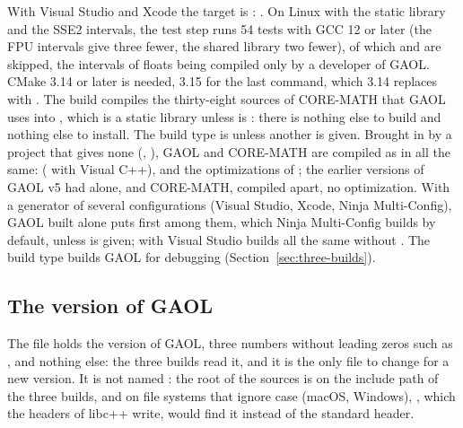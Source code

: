 \noindent
With Visual Studio and Xcode the target is : . On Linux with the static library
and the SSE2 intervals, the test step runs 54 tests with GCC 12 or later (the FPU intervals give
three fewer, the shared library two fewer), of which  and  are skipped, the
intervals of floats being compiled only by a developer of GAOL. CMake 3.14 or
later is needed, 3.15 for the last command, which 3.14 replaces with
. The build compiles the thirty-eight sources of
CORE-MATH that GAOL uses into , which is a static library unless
 is : there is nothing else to build and
nothing else to install. The build type is  unless another is
given. Brought in by a project that gives none (,
), GAOL and CORE-MATH are compiled as in  all
the same:  ( with Visual C++),  and the
optimizations of ; the earlier versions of GAOL v5 had
 alone, and CORE-MATH, compiled apart, no optimization. With a
generator of several
configurations (Visual Studio, Xcode, Ninja Multi-Config), GAOL built alone
puts  first among them, which Ninja Multi-Config builds by
default, unless  is given;  with Visual Studio builds  all the same without
.\newinvfive{} The  build type builds GAOL for
debugging (Section~\ref{sec:three-builds}).

\subsection{The version of GAOL}\label{sec:install-version}
%

The file  holds the version of GAOL, three numbers without
leading zeros such as , and nothing else: the three builds read
it, and it is the only file to change for a new version.\newinvfive{} It is
not named : the root of the sources is on the include path of
the three builds, and on file systems that ignore case (macOS, Windows),
, which the headers of libc++ write, would find it
instead of the standard header.

